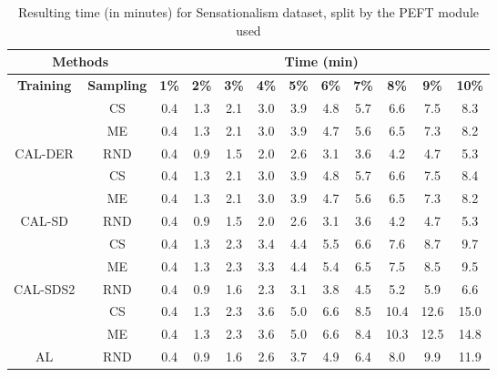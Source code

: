 \begin{table}[htbp]
\begin{subtable}{\linewidth}
\begin{tabular}{c|c|cccccccccc}
\toprule
\multicolumn{2}{c|}{\textbf{Methods}} & \multicolumn{10}{c}{\textbf{Time (min)}} \\
\midrule
\textbf{Training} & \textbf{Sampling} & \textbf{1\%} & \textbf{2\%} & \textbf{3\%} & \textbf{4\%} & \textbf{5\%} & \textbf{6\%} & \textbf{7\%} & \textbf{8\%} & \textbf{9\%} & \textbf{10\%}\\
\midrule
 & CS & 0.4 & 1.3 & 2.1 & 3.0 & 3.9 & 4.8 & 5.7 & 6.6 & 7.5 & 8.3\\

 & ME & 0.4 & 1.3 & 2.1 & 3.0 & 3.9 & 4.7 & 5.6 & 6.5 & 7.3 & 8.2\\

\multirow{-3}{*}{\raggedright\arraybackslash CAL-DER} & RND & 0.4 & 0.9 & 1.5 & 2.0 & 2.6 & 3.1 & 3.6 & 4.2 & 4.7 & 5.3\\
\midrule
 & CS & 0.4 & 1.3 & 2.1 & 3.0 & 3.9 & 4.8 & 5.7 & 6.6 & 7.5 & 8.4\\

 & ME & 0.4 & 1.3 & 2.1 & 3.0 & 3.9 & 4.7 & 5.6 & 6.5 & 7.3 & 8.2\\

\multirow{-3}{*}{\raggedright\arraybackslash CAL-SD} & RND & 0.4 & 0.9 & 1.5 & 2.0 & 2.6 & 3.1 & 3.6 & 4.2 & 4.7 & 5.3\\
\midrule
 & CS & 0.4 & 1.3 & 2.3 & 3.4 & 4.4 & 5.5 & 6.6 & 7.6 & 8.7 & 9.7\\

 & ME & 0.4 & 1.3 & 2.3 & 3.3 & 4.4 & 5.4 & 6.5 & 7.5 & 8.5 & 9.5\\

\multirow{-3}{*}{\raggedright\arraybackslash CAL-SDS2} & RND & 0.4 & 0.9 & 1.6 & 2.3 & 3.1 & 3.8 & 4.5 & 5.2 & 5.9 & 6.6\\
\midrule
 & CS & 0.4 & 1.3 & 2.3 & 3.6 & 5.0 & 6.6 & 8.5 & 10.4 & 12.6 & 15.0\\

 & ME & 0.4 & 1.3 & 2.3 & 3.6 & 5.0 & 6.6 & 8.4 & 10.3 & 12.5 & 14.8\\

\multirow{-3}{*}{\raggedright\arraybackslash AL} & RND & 0.4 & 0.9 & 1.6 & 2.6 & 3.7 & 4.9 & 6.4 & 8.0 & 9.9 & 11.9\\
\bottomrule
\end{tabular}
\end{subtable}
\caption{Resulting time (in minutes) for Sensationalism dataset, split by the PEFT module used}
\label{tab:time_short_sensation_10}
\end{table}
